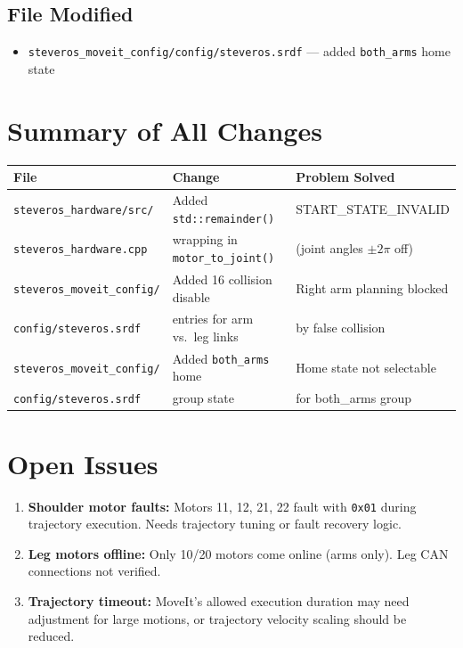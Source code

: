 \documentclass[11pt,a4paper]{article}
\begin{document}
\subsection{File Modified}
\begin{itemize}
  \item \texttt{steveros\_moveit\_config/config/steveros.srdf} --- added \texttt{both\_arms} home state
\end{itemize}

\section{Summary of All Changes}

\begin{table}[h]
\centering
\begin{tabular}{@{}lll@{}}
\toprule
\textbf{File} & \textbf{Change} & \textbf{Problem Solved} \\
\midrule
\texttt{steveros\_hardware/src/} & Added \texttt{std::remainder()} & START\_STATE\_INVALID \\
\texttt{steveros\_hardware.cpp} & wrapping in \texttt{motor\_to\_joint()} & (joint angles $\pm 2\pi$ off) \\
\midrule
\texttt{steveros\_moveit\_config/} & Added 16 collision disable & Right arm planning blocked \\
\texttt{config/steveros.srdf} & entries for arm vs.\ leg links & by false collision \\
\midrule
\texttt{steveros\_moveit\_config/} & Added \texttt{both\_arms} home & Home state not selectable \\
\texttt{config/steveros.srdf} & group state & for both\_arms group \\
\bottomrule
\end{tabular}
\end{table}

\section{Open Issues}

\begin{enumerate}
  \item \textbf{Shoulder motor faults:} Motors 11, 12, 21, 22 fault with \texttt{0x01}
    during trajectory execution. Needs trajectory tuning or fault recovery logic.
  \item \textbf{Leg motors offline:} Only 10/20 motors come online (arms only).
    Leg CAN connections not verified.
  \item \textbf{Trajectory timeout:} MoveIt's allowed execution duration may need
    adjustment for large motions, or trajectory velocity scaling should be reduced.
\end{enumerate}
\end{document}
